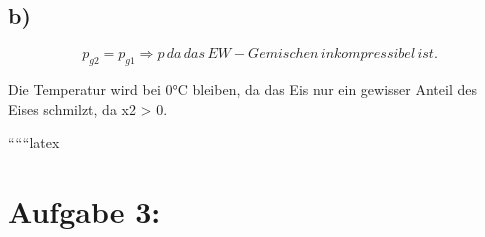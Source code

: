 

\subsection*{b)}

\[
p_{g2} = p_{g1} \Rightarrow p \, da \, das \, EW-Gemischen \, inkompressibel \, ist.
\]

Die Temperatur wird bei 0°C bleiben, da das Eis nur ein gewisser Anteil des Eises schmilzt, da x2 > 0.

``````latex


\section*{Aufgabe 3:}